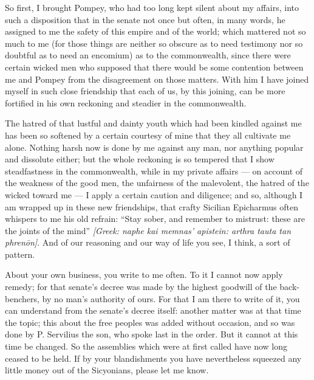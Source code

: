  So first, I brought Pompey, who had too long kept silent about my affairs, into such a disposition that in the senate not once but often, in many words, he assigned to me the safety of this empire and of the world; which mattered not so much to me (for those things are neither so obscure as to need testimony nor so doubtful as to need an encomium) as to the commonwealth, since there were certain wicked men who supposed that there would be some contention between me and Pompey from the disagreement on those matters. With him I have joined myself in such close friendship that each of us, by this joining, can be more fortified in his own reckoning and steadier in the commonwealth.

 The hatred of that lustful and dainty youth which had been kindled against me has been so softened by a certain courtesy of mine that they all cultivate me alone. Nothing harsh now is done by me against any man, nor anything popular and dissolute either; but the whole reckoning is so tempered that I show steadfastness in the commonwealth, while in my private affairs --- on account of the weakness of the good men, the unfairness of the malevolent, the hatred of the wicked toward me --- I apply a certain caution and diligence; and so, although I am wrapped up in these new friendships, that crafty Sicilian Epicharmus often whispers to me his old refrain: ``Stay sober, and remember to mistrust: these are the joints of the mind'' \textit{[Greek: naphe kai memnas' apistein: arthra tauta tan phren\=on]}. And of our reasoning and our way of life you see, I think, a sort of pattern.

 About your own business, you write to me often. To it I cannot now apply remedy; for that senate's decree was made by the highest goodwill of the back-benchers, by no man's authority of ours. For that I am there to write of it, you can understand from the senate's decree itself: another matter was at that time the topic; this about the free peoples was added without occasion, and so was done by P. Servilius the son, who spoke last in the order. But it cannot at this time be changed. So the assemblies which were at first called have now long ceased to be held. If by your blandishments you have nevertheless squeezed any little money out of the Sicyonians, please let me know.

